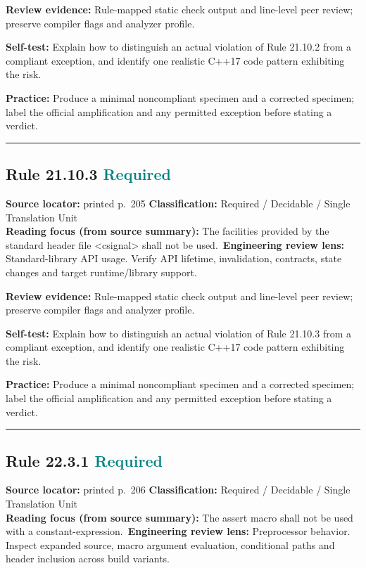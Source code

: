 \documentclass[10pt,letterpaper]{article}
\begin{document}
\textbf{Review evidence:} Rule-mapped static check output and line-level peer review; preserve compiler flags and analyzer profile.

\textbf{Self-test:} Explain how to distinguish an actual violation of Rule 21.10.2 from a compliant exception, and identify one realistic C++17 code pattern exhibiting the risk.\par
\textbf{Practice:} Produce a minimal noncompliant specimen and a corrected specimen; label the official amplification and any permitted exception before stating a verdict.
\smallskip\hrule\smallskip
\subsection*{Rule 21.10.3 \enspace \texorpdfstring{\small\textcolor{teal}{Required}}{Required}}
\noindent\textbf{Source locator:} printed p.~205 \quad\textbf{Classification:} Required / Decidable / Single Translation Unit\\
\textbf{Reading focus (from source summary):} The facilities provided by the standard header file \textless{}csignal\textgreater{} shall not be used.\
\textbf{Engineering review lens:} Standard-library API usage. Verify API lifetime, invalidation, contracts, state changes and target runtime/library support.

\textbf{Review evidence:} Rule-mapped static check output and line-level peer review; preserve compiler flags and analyzer profile.

\textbf{Self-test:} Explain how to distinguish an actual violation of Rule 21.10.3 from a compliant exception, and identify one realistic C++17 code pattern exhibiting the risk.\par
\textbf{Practice:} Produce a minimal noncompliant specimen and a corrected specimen; label the official amplification and any permitted exception before stating a verdict.
\smallskip\hrule\smallskip
\subsection*{Rule 22.3.1 \enspace \texorpdfstring{\small\textcolor{teal}{Required}}{Required}}
\noindent\textbf{Source locator:} printed p.~206 \quad\textbf{Classification:} Required / Decidable / Single Translation Unit\\
\textbf{Reading focus (from source summary):} The assert macro shall not be used with a constant-expression.\
\textbf{Engineering review lens:} Preprocessor behavior. Inspect expanded source, macro argument evaluation, conditional paths and header inclusion across build variants.
\end{document}
